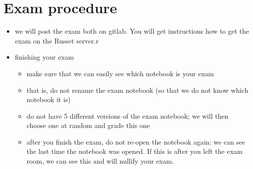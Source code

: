 \documentclass[]{book}
\providecommand{\tightlist}{%
  \setlength{\itemsep}{0pt}\setlength{\parskip}{0pt}}
\begin{document}
\hypertarget{exam-procedure}{%
\section{Exam procedure}\label{exam-procedure}}

\begin{itemize}
\tightlist
\item
  we will post the exam both on gitlab. You will get instructions how to get the exam on the Russet server.r
\item
  finishing your exam

  \begin{itemize}
  \tightlist
  \item
    make sure that we can easily see which notebook is your exam
  \item
    that is, do not rename the exam notebook (so that we do not know which notebook it is)
  \item
    do not have 5 different versions of the exam notebook; we will then choose one at random and grade this one
  \item
    after you finish the exam, do not re-open the notebook again: we can see the last time the notebook was opened. If this is after you left the exam room, we can see this and will nullify your exam.
  \end{itemize}
\end{itemize}


\end{document}
